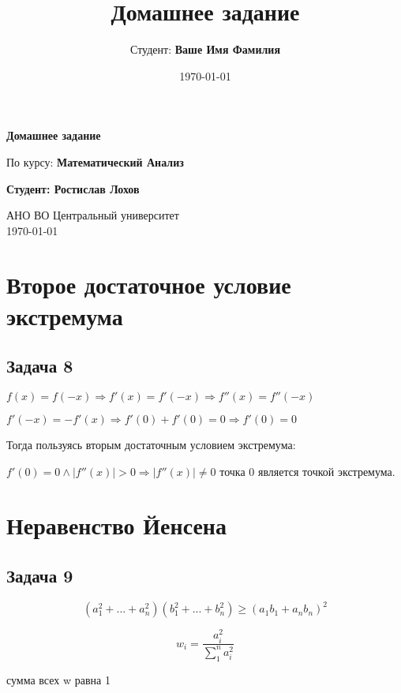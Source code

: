 \documentclass[a4paper,12pt]{article}
\title{Домашнее задание}
\author{Студент: \textbf{Ваше Имя Фамилия}}
\date{\today}
\begin{document}
\begin{titlepage}
    \centering
    \vspace*{1cm}

    \Huge
    \textbf{Домашнее задание}

    \vspace{0.5cm}
    \LARGE
    По курсу: \textbf{Математический Анализ}

    \vspace{1.5cm}

    \textbf{Студент: Ростислав Лохов}

    \vfill

    \Large
    АНО ВО Центральный университет\\
    \vspace{0.3cm}
    \today

\end{titlepage}

\tableofcontents
\newpage

\section{Второе достаточное условие экстремума}

\subsection{Задача 8}
$f(x) = f(-x) \Rightarrow f'(x) = f'(-x) \Rightarrow f''(x) = f''(-x)$


$f'(-x)=-f'(x) \Rightarrow f'(0)+f'(0) = 0 \Rightarrow f'(0) = 0$

Тогда пользуясь вторым достаточным условием экстремума:

$f'(0)=0 \land |f''(x)| > 0 \Rightarrow |f''(x)| \ne 0$ точка 0 является точкой экстремума.

\section{Неравенство Йенсена}

\subsection{Задача 9}

\[
(a_1^2+...+a_n^2)(b_1^2+...+b_n^2) \ge (a_1b_1 + a_nb_n)^2
\]

\[
w_i = \frac{a_i^2}{\sum_{1}^{n}a_i^2}
\]

сумма всех w равна 1
\end{document}
